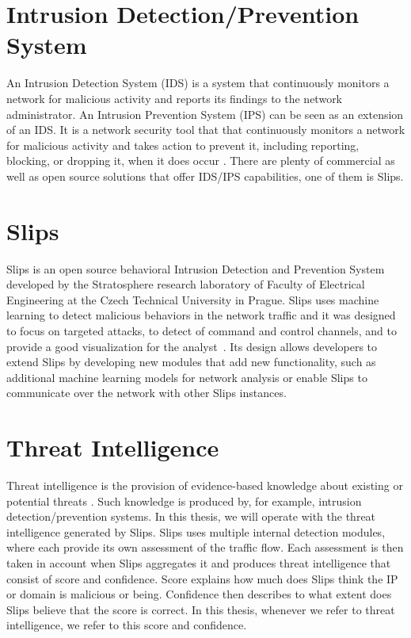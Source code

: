 
\section{Intrusion Detection/Prevention System}
\label{sec:intrusion-detection-prevention-system}
An Intrusion Detection System (IDS) is a system that continuously monitors a network for malicious activity and reports its findings to the network administrator.
An Intrusion Prevention System (IPS) can be seen as an extension of an IDS. 
It is a network security tool that that continuously monitors a network for malicious activity and takes action to prevent it, including reporting, blocking, or dropping it, when it does occur \cite{vmware}.
There are plenty of commercial as well as open source solutions that offer IDS/IPS capabilities, one of them is Slips.

\section{Slips}
\label{sec:slips}
Slips is an open source behavioral Intrusion Detection and Prevention System developed by the Stratosphere research laboratory of Faculty of Electrical Engineering at the Czech Technical University in Prague.
Slips uses machine learning to detect malicious behaviors in the network traffic and it was designed to focus on targeted attacks, to detect of command and control channels, and to provide a good visualization for the analyst~\cite{slips}.
Its design allows developers to extend Slips by developing new modules that add new functionality, such as additional machine learning models for network analysis or enable Slips to communicate over the network with other Slips instances.

\section{Threat Intelligence}
\label{sec:threat-intelligence}
Threat intelligence is the provision of evidence-based knowledge about existing or potential threats \cite{threatintelligence}.
Such knowledge is produced by, for example, intrusion detection/prevention systems. 
In this thesis, we will operate with the threat intelligence generated by Slips.
Slips uses multiple internal detection modules, where each provide its own assessment of the traffic flow. 
Each assessment is then taken in account when Slips aggregates it and produces threat intelligence that consist of score and confidence.
Score explains how much does Slips think the IP or domain is malicious or being.
Confidence then describes to what extent does Slips believe that the score is correct.
In this thesis, whenever we refer to threat intelligence, we refer to this score and confidence.


